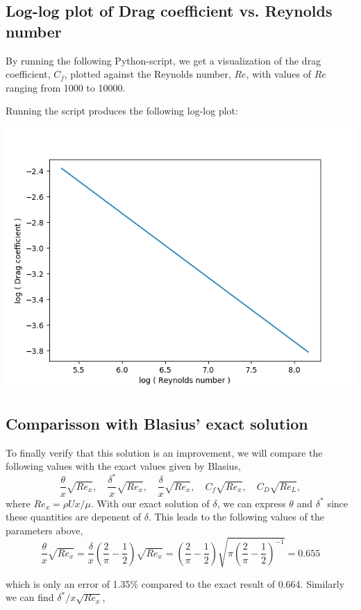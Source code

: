 \documentclass[12pt]{amsart}
\begin{document}
\subsection*{Log-log plot of Drag coefficient vs. Reynolds number}
By running the following Python-script, we get a visualization of the drag coefficient, $C_f$, plotted against the Reynolds number, $Re$, with values of $Re$ ranging from 1000 to 10000. 

Running the script produces the following log-log plot:
\begin{center}
\includegraphics{loglog}
\end{center}

\subsection*{Comparisson with Blasius' exact solution}
To finally verify that this solution is an improvement, we will compare the following values with the exact values given by Blasius,
\[
  \frac{\theta}{x}\sqrt{Re_x},\quad 
  \frac{\delta^*}{x}\sqrt{Re_x}, \quad
  \frac{\delta}{x}\sqrt{Re_x}, \quad
  C_f\sqrt{Re_x}, \quad
  C_D\sqrt{Re_L},
\]
where $Re_x = \rho U x / \mu$.
With our exact solution of $\delta$, we can express $\theta$ and $\delta^*$ since these quantities are depenent of $\delta$. This leads to the following values of the parameters above,
\[
  \frac{\theta}{x}\sqrt{Re_x} = \frac{\delta}{x} \left( \frac{2}{\pi} - \frac{1}{2} \right)\sqrt{Re_x} =
  \left( \frac{2}{\pi} - \frac{1}{2} \right)\sqrt{\pi \left( \frac{2}{\pi} - \frac{1}{2} \right)^{-1}}  = 0.655
\]

which is only an error of 1.35\% compared to the exact result of 0.664.
Similarly we can find $\delta^*/x \sqrt{Re_x}$, 
\end{document}
